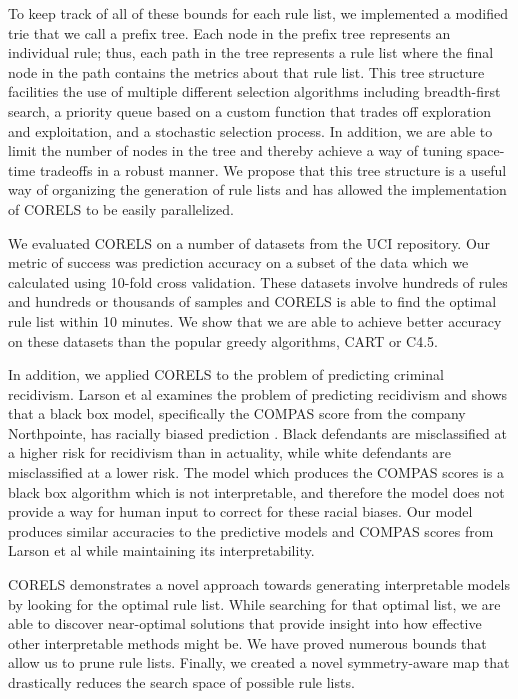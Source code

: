 \documentclass[]{article}
\begin{document}
To keep track of all of these bounds for each rule list, we implemented a modified trie that we call a prefix tree. Each node in the prefix tree represents an individual rule; thus, each path in the tree represents a rule list where the final node in the path contains the metrics about that rule list. This tree structure facilities the use of multiple different selection algorithms including breadth-first search, a priority queue based on a custom function that trades off exploration and exploitation, and a stochastic selection process. In addition, we are able to limit the number of nodes in the tree and thereby achieve a way of tuning space-time tradeoffs in a robust manner. We propose that this tree structure is a useful way of organizing the generation of rule lists and has allowed the implementation of CORELS to be easily parallelized.

We evaluated CORELS on a number of datasets from the UCI repository. Our metric of success was prediction accuracy on a subset of the data which we calculated using 10-fold cross validation. These datasets involve hundreds of rules and hundreds or thousands of samples and CORELS is able to find the optimal rule list within 10 minutes. We show that we are able to achieve better accuracy on these datasets than the popular greedy algorithms, CART or C4.5.

In addition, we applied CORELS to the problem of predicting criminal recidivism. Larson et al examines the problem of predicting recidivism and shows that a black box model, specifically the COMPAS score from the company Northpointe, has racially biased prediction \cite{LarsonMaKiAn16}. Black defendants are misclassified at a higher risk for recidivism than in actuality, while white defendants are misclassified at a lower risk. The model which produces the COMPAS scores is a black box algorithm which is not interpretable, and therefore the model does not provide a way for human input to correct for these racial biases. Our model produces similar accuracies to the predictive models and COMPAS scores from Larson et al while maintaining its interpretability.

CORELS demonstrates a novel approach towards generating interpretable models by looking for the optimal rule list. While searching for that optimal list, we are able to discover near-optimal solutions that provide insight into how effective other interpretable methods might be. We have proved numerous bounds that allow us to prune rule lists. Finally, we created a novel symmetry-aware map that drastically reduces the search space of possible rule lists.
\end{document}

